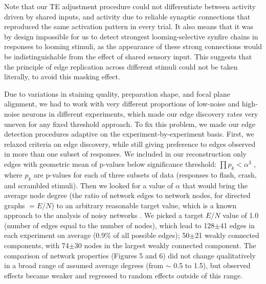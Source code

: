 \documentclass{article}
\begin{document}
Note that our TE adjustment procedure could not differentiate between activity driven by shared inputs, and activity due to reliable synaptic connections that reproduced the same activation pattern in every trial. It also means that it was by design impossible for us to detect strongest looming-selective synfire chains in responses to looming stimuli, as the appearance of these strong connections would be indistinguishable from the effect of shared sensory input. This suggests that the principle of edge replication across different stimuli could not be taken literally, to avoid this masking effect.

Due to variations in staining quality, preparation shape, and focal plane alignment, we had to work with very different proportions of low-noise and high-noise neurons in different experiments, which made our edge discovery rates very uneven for any fixed threshold approach. To fix this problem, we made our edge detection procedures adaptive on the experiment-by-experiment basis. First, we relaxed criteria on edge discovery, while still giving preference to edges observed in more than one subset of responses. We included in our reconstruction only edges with geometric mean of p-values below significance threshold: $\prod{p_k}<\alpha^3$ , where $p_k$ are p-values for each of three subsets of data (responses to flash, crash, and scrambled stimuli). Then we looked for a value of $\alpha$ that would bring the average node degree (the ratio of network edges to network nodes, for directed graphs $=E/N$) to an arbitrary reasonable target value, which is a known approach to the analysis of noisy networks \citep{stetter2012te}. We picked a target $E/N$ value of 1.0 (number of edges equal to the number of nodes), which lead to 128$\pm$41 edges in each experiment on average (0.9\% of all possible edges); 50$\pm$21 weakly connected components, with 74$\pm$30 nodes in the largest weakly connected component. The comparison of network properties (Figures 5 and 6) did not change qualitatively in a broad range of assumed average degrees (from $\sim$ 0.5 to 1.5), but observed effects became weaker and regressed to random effects outside of this range. 
\end{document}
